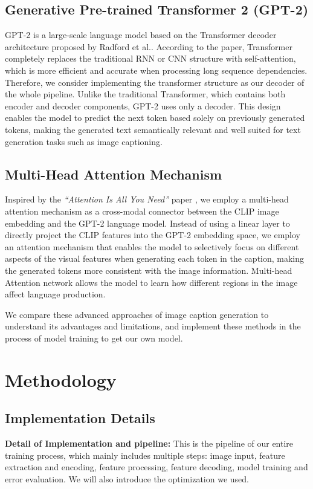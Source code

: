 \documentclass[11pt]{article}
\begin{document}
    \subsection{Generative Pre-trained Transformer 2 (GPT-2)}
    GPT-2 is a large-scale language model based on the Transformer 
    decoder architecture proposed by Radford et al.\cite{Radford}. 
    According to the paper, Transformer completely replaces the traditional RNN or 
    CNN structure with self-attention, which is more efficient and accurate when processing 
    long sequence dependencies. Therefore, we consider implementing the transformer 
    structure as our decoder of the whole pipeline. Unlike the traditional 
    Transformer, which contains both encoder and decoder components, 
    GPT-2 uses only a decoder. This design enables the model to predict the next token based solely on previously generated tokens, 
    making the generated text semantically relevant and well suited for text generation tasks such as image captioning.
    
    \subsection{Multi-Head Attention Mechanism}
    Inspired by the \textit{``Attention Is All You Need''} paper 
    \cite{vaswani2017attention}, we employ a multi-head attention 
    mechanism as a cross-modal connector between the CLIP image embedding
    and the GPT-2 language model. Instead of using a linear layer to directly 
    project the CLIP features into the GPT-2 embedding space, we employ an 
    attention mechanism that enables the model to selectively focus on 
    different aspects of the visual features when generating each token 
    in the caption, making the generated tokens more consistent with the 
    image information. Multi-head Attention network allows the model to 
    learn how different regions in the image affect language production.

We compare these advanced approaches of image caption generation to understand its 
advantages and limitations, and implement these methods in the process of model training to get our own model.
\pagebreak
\section{Methodology}

\subsection{Implementation Details}
\textbf{Detail of Implementation and pipeline:} This is the pipeline of 
our entire training process, which mainly includes multiple steps: 
image input, feature extraction and encoding, feature processing, 
feature decoding, model training and error evaluation. We will also 
introduce the optimization we used.
\end{document}
